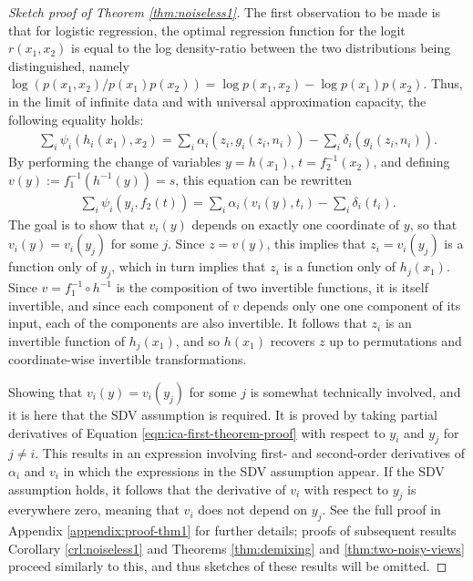 \begin{proof}[Sketch proof of Theorem \ref{thm:noiseless1}]
The first observation to be made is that for logistic regression, the optimal regression function for the logit $r(x_1, x_2)$ is equal to the log density-ratio between the two distributions being distinguished, namely $\log\left( p(x_1, x_2) / p(x_1)p(x_2)\right) = \log p(x_1, x_2) - \log p(x_1)p(x_2)$.
Thus, in the limit of infinite data and with universal approximation capacity, the following equality holds:
%
\begin{align*}
\sum_{i}\psi_{i}(h_{i}({x}_{1}),{x}_{2}) = \sum_i \alpha_i(z_i, g_i(z_i, n_i)) - \sum_i \delta_i(g_i(z_i, n_i)).
\end{align*}
%
By performing the change of variables $y=h(x_1)$, $t=f_2^{-1}(x_2)$, and defining $v(y) := f_1^{-1}(h^{-1}(y)) = s$, this equation can be rewritten
%
\begin{align}
\sum_{i}\psi_{i}(y_i,f_2(t)) = \sum_i \alpha_i(v_i(y), t_i) - \sum_i \delta_i(t_i). \label{eqn:ica-first-theorem-proof}
\end{align}
%
The goal is to show that $v_i(y)$ depends on exactly one coordinate of $y$, so that $v_i(y) = v_i(y_j)$ for some $j$. 
Since $z = v(y)$, this implies that $z_i = v_i(y_j)$ is a function only of $y_j$, which in turn implies that $z_i$ is a function only of $h_j(x_1)$. 
Since $v = f_1^{-1} \circ h^{-1}$ is the composition of two invertible functions, it is itself invertible, and since each component of $v$ depends only one one component of its input, each of the components are also invertible.
It follows that $z_i$ is an invertible function of $h_j(x_1)$, and so $h(x_1)$ recovers $z$ up to permutations and coordinate-wise invertible transformations.

Showing that $v_i(y) = v_i(y_j)$ for some $j$ is somewhat technically involved, and it is here that the SDV assumption is required.
It is proved by taking partial derivatives of Equation \ref{eqn:ica-first-theorem-proof} with respect to $y_i$ and $y_j$ for $j\not=i$. 
This results in an expression involving first- and second-order derivatives of $\alpha_i$ and $v_i$ in which the expressions in the SDV assumption appear. 
If the SDV assumption holds, it follows that the derivative of $v_i$ with respect to $y_j$ is everywhere zero, meaning that $v_i$ does not depend on $y_j$. 
See the full proof in Appendix \ref{appendix:proof-thm1} for further details; proofs of subsequent results Corollary \ref{crl:noiseless1} and Theorems \ref{thm:demixing} and \ref{thm:two-noisy-views} proceed similarly to this, and thus sketches of these results will be omitted.
\end{proof}

